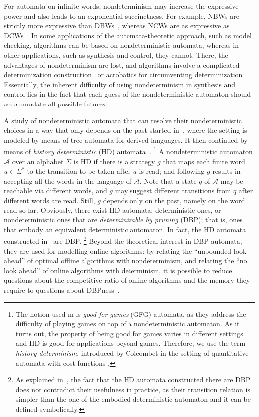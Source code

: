 \documentclass[10pt,a4paper]{amsart}
\theoremstyle{definition}
\numberwithin{equation}{section}
\newcommand{\A}{{\mathcal A}}
\begin{document}
For automata on infinite words, nondeterminism may increase the expressive power and also leads to an exponential succinctness. For example, NBWs are strictly more expressive than DBWs~\cite{Lan69}, whereas NCWs are as expressive as DCWs~\cite{MH84}. In some applications of the automata-theoretic approach, such as model checking, algorithms can be based on nondeterministic automata, whereas in other applications, such as synthesis and control, they cannot. There, the advantages of nondeterminism are lost, and algorithms involve a complicated determinization construction~\cite{Saf88} or acrobatics for circumventing determinization~\cite{KV05c}.
Essentially, the inherent difficulty of using nondeterminism in synthesis and control lies in the fact that each guess of the nondeterministic automaton should accommodate all possible futures. 

A study of nondeterministic automata that can resolve their nondeterministic choices in a way that only depends on the past started in~\cite{KSV06}, where the setting is modeled by means of tree automata for derived languages. It then continued by means of  {\em history deterministic\/}  (HD) automata~\cite{HP06}.
\footnote{The notion used in \cite{HP06} is {\em good for games} (GFG) automata, as they address the difficulty of playing games on top of a nondeterministic automaton. As it turns out, the property of being good for games varies in different settings and HD is good for applications beyond games. Therefore, we use the term {\em history determinism}, introduced by Colcombet in the setting of quantitative automata with cost functions \cite{Col09}.} 
A nondeterministic automaton $\A$ over an alphabet $\Sigma$ is HD if there is a strategy $g$ that maps each finite word $u \in \Sigma^*$ to the transition to be taken after $u$ is read; and following $g$ results in accepting all the words in the language of $\A$. Note that a state $q$ of $\A$ may be reachable via different words, and $g$ may suggest different transitions from $q$ after different words are read. Still, $g$ depends only on the past, namely on the word read so far. Obviously, there exist HD automata: deterministic ones, or nondeterministic ones that are {\em determinizable by pruning\/} (DBP); that is, ones that embody an equivalent deterministic automaton. In fact, the HD automata constructed in~\cite{HP06} are DBP.
\footnote{As explained in~\cite{HP06}, the fact that the HD automata constructed there are DBP does not contradict their usefulness in practice, as their transition relation is simpler than the one of the embodied deterministic automaton and it can be defined symbolically.} 
Beyond the theoretical interest in DBP automata, they are used for modelling online algorithms: by relating the ``unbounded look ahead''
of optimal offline algorithms with nondeterminism, and relating the ``no look ahead'' of online algorithms with
determinism, it is possible to reduce questions about the competitive ratio of online algorithms and the memory
they require to questions about DBPness~\cite{AKL10,AK15}. 
 
\end{document}
